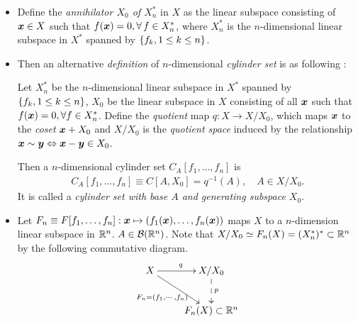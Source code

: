 \documentclass[11pt]{article}
\begin{document}
\begin{itemize}
\item Define the \emph{annihilator $X_{0}$ of $X_{n}^{*}$} in $X$ as the linear subspace consisting of $\boldsymbol{x}\in X$ such that $f(\boldsymbol{x}) = 0, \forall\, f\in X_{n}^{*}$, where $X_{n}^{*}$ is the $n$-dimensional linear subspace in $X^{*}$ spanned by $\left\{f_{k}, 1\le k\le n\right\}$.


\item Then an alternative \emph{definition} of $n$-dimensional \emph{cylinder set} is as following \citep{gel2014generalized}:
\begin{definition}
Let $X_{n}^{*}$ be the $n$-dimensional linear subspace in $X^{*}$ spanned by $\left\{f_{k}, 1\le k\le n\right\}$, $X_{0}$ be the linear subspace in $X$ consisting of all $\boldsymbol{x}$ such that $f(\boldsymbol{x})= 0, \forall f\in X_{n}^{*}$. Define the \emph{quotient} map $q: X \rightarrow X/X_{0}$, which maps $\boldsymbol{x}$ to the \emph{coset} $\boldsymbol{x}+X_{0}$ and $X/X_{0}$ is the \emph{quotient space} induced by the relationship $\boldsymbol{x}\sim \boldsymbol{y} \Leftrightarrow \boldsymbol{x}-\boldsymbol{y}\in X_{0}$. 

Then a $n$-dimensional cylinder set $C_{A}[f_{1},\ldots, f_{n}]$ is 
\begin{align*}
C_{A}[f_{1},\ldots, f_{n}]\equiv C[A, X_{0}] = q^{-1}(A),\quad A\in X/X_{0}. 
\end{align*}
It is called a \emph{cylinder set with base $A$ and generating subspace $X_{0}$}. \\
\end{definition}

\item Let $F_{n}\equiv F[f_{1},\ldots, f_{n}]: \boldsymbol{x} \mapsto \left(f_{1}(\boldsymbol{x}),  \ldots, f_{n}(\boldsymbol{x})\right)$ maps $X$ to a $n$-dimension linear subspace in ${\mathbb R}^{n}$. $A\in {\mathcal B}({\mathbb R}^{n})$. Note that $X/X_{0}\simeq F_{n}(X)= (X_{n}^{*})^{*}\subset {\mathbb R}^{n}$ by the following commutative diagram.
\begin{align*}
\xymatrix{
X \ar[rd]_{F_{n}= (f_{1},\cdots,f_{n})} \ar[r]^q & X/X_{0}  \ar@{-->}[d]^{p}\\
&F_{n}(X)\subset \bR^{n}
}
\end{align*}


%


\end{itemize}
\end{document}
